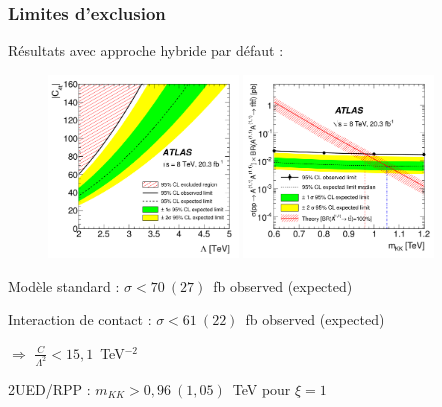 \begin{frame}
\frametitle{Limites d'exclusion}

\begin{small}
\begin{maliste}
\item R\'esultats avec approche hybride par d\'efaut :
\end{maliste}

\begin{figure}[!htb]
\begin{center}
\hspace*{-1cm}
\includegraphics[width=0.45\textwidth]{Figures/FourTops/fig_11a.png}
\includegraphics[width=0.45\textwidth]{Figures/FourTops/fig_11c.png}
\end{center}
\end{figure}
\begin{maliste}
\item Modèle standard : $\sigma < 70~(27)$~fb observed (expected)
\vspace*{0.1cm}
\item Interaction de contact : $\sigma < 61~(22)$~fb observed (expected) \\
\begin{center}
$\Rightarrow$ $\frac{C}{\Lambda^2} < 15,1$~TeV$^{-2}$
\end{center}
\vspace*{0.1cm}
\item 2UED/RPP : $m_{KK}>0,96~(1,05)$~TeV pour $\xi=1$
\end{maliste}
\end{small}
\end{frame}

